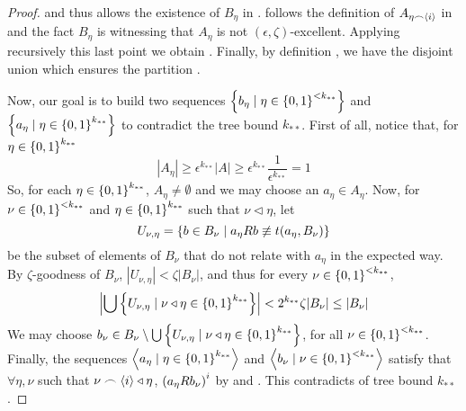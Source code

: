 \begin{lemma}[Claim 5.4]
\begin{proof}
            and thus allows the existence of $B_\eta$ in .
             follows the definition of $A_{\eta \frown \left< i \right>}$ in
             and the fact $B_\eta$ is witnessing that $A_\eta$ is not $(\epsilon, \zeta)$-excellent.
            Applying recursively this last point we obtain .
            Finally, by definition , we have the disjoint union
             which ensures
            the partition .

            Now, our goal is to build two sequences $\left\{ b_\eta \mid \eta \in \left\{ 0,1 \right\}^{<k_{**}} \right\}$ and
            $\left\{ a_\eta \mid \eta \in \left\{ 0,1 \right\}^{k_{**}} \right\}$ to contradict the tree bound $k_{**}$.
            First of all, notice that, for $\eta \in \left\{ 0,1 \right\}^{k_{**}}$
            \[
                |A_\eta| \geq \epsilon^{k_{**}} |A| \geq
                \epsilon^{k_{**}} \frac{1}{\epsilon^{k_{**}}} = 1
            \]
            So, for each $\eta \in \left\{ 0,1 \right\}^{k_{**}}$, $A_\eta \neq \emptyset$ and we may choose an $a_\eta \in A_\eta$.
            Now, for $\nu \in \left\{ 0,1 \right\}^{<k_{**}}$ and $\eta \in \left\{ 0,1 \right\}^{k_{**}}$ such that $\nu \triangleleft \eta$, let
            \[
                U_{\nu,\eta} = \left\{ b \in B_\nu \mid a_\eta R b \not\equiv t(a_\eta, B_\nu) \right\}
            \]
            be the subset of elements of $B_\nu$ that do not relate with $a_\eta$ in the expected way.
            By $\zeta$-goodness of $B_\nu$, $|U_{\nu, \eta}| < \zeta |B_\nu|$, and thus for every $\nu \in \left\{ 0,1 \right\}^{<k_{**}}$,
            \[
                \left| \bigcup\left\{  U_{\nu,\eta} \mid \nu \triangleleft \eta \in \left\{ 0,1 \right\}^{k_{**}} \right\} \right| <
                2^{k_{**}} \zeta |B_\nu| \leq |B_\nu|
            \]
            We may choose $b_\nu \in B_\nu \setminus \bigcup\left\{ U_{\nu,\eta} \mid \nu \triangleleft \eta \in \left\{ 0,1 \right\}^{k_{**}} \right\}$,
            for all $\nu \in \left\{ 0,1 \right\}^{<k_{**}}$.
            Finally, the sequences $\left< a_\eta \mid \eta \in \left\{ 0,1 \right\}^{k_{**}} \right>$ and $\left< b_\nu \mid \nu \in \left\{ 0,1 \right\}^{<k_{**}} \right>$
            satisfy that $\forall \eta, \nu$ such that $\nu \frown \left< i \right> \triangleleft \eta$, $\left( a_\eta R b_\nu \right)^i$
            by  and .
            This contradicts  of tree bound $k_{**}$.
        \end{proof}
    \end{lemma}

